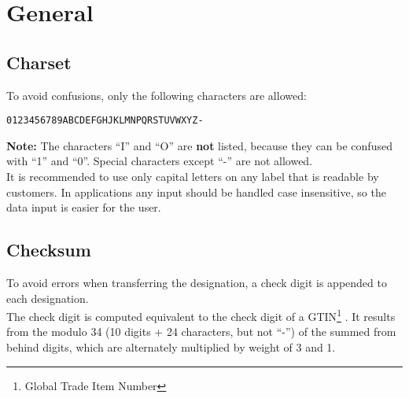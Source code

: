 %
%
%
%
%
%
%

\section{General}


\subsection{Charset}

To avoid confusions, only the following characters are allowed:

\begin{verbatim}
0123456789ABCDEFGHJKLMNPQRSTUVWXYZ-
\end{verbatim}

\textbf{Note:} The characters ``I'' and ``O'' are \textbf{not} listed, because
they can be confused with ``1'' and ``0''. Special characters except ``-'' are
not allowed. \\


It is recommended to use only capital letters on any label that is readable by
customers. In applications any input should be handled case insensitive, so the
data input is easier for the user.



\subsection{Checksum}

To avoid errors when transferring the designation, a check digit is appended to
each designation. \\

The check digit is computed equivalent to the check digit of a
GTIN\footnote{Global Trade Item Number} \cite{ean_checksum}. It results from the
modulo 34 (10 digits + 24 characters, but not ``-'') of the summed from behind
digits, which are alternately multiplied by weight of 3 and 1. \\

